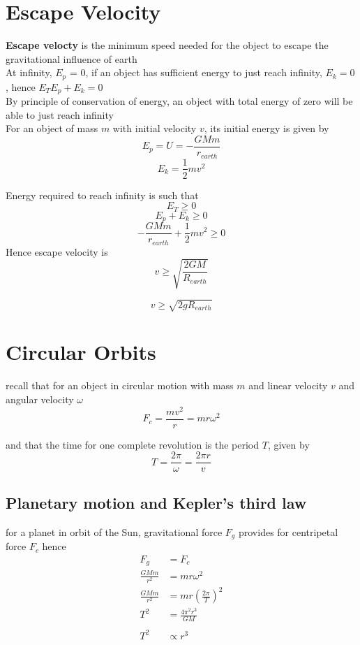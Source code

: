 \documentclass[a4paper, 10pt]{article}
\begin{document}
\section{Escape Velocity}
\textbf{Escape velocty} is the minimum speed needed for the object to escape the gravitational influence of earth \\

At infinity, $E_p$ = 0, if an object has sufficient energy to just reach infinity, $E_k = 0$, hence $E_T E_p + E_k = 0$ \\

By principle of conservation of energy, an object with total energy of zero will be able to just reach infinity \\

For an object of mass $m$ with initial velocity $v$, its initial energy is given by
\[
   E_p = U = - \frac{GMm}{r_{earth}}
\]
\[
E_k = \frac{1}{2} mv^2
\]

Energy required to reach infinity is such that
\[
 E_T \ge 0
\]
\[
E_p + E_k \ge 0
\]
\[
    - \frac{GMm}{r_{earth}}  + \frac{1}{2}mv^2 \ge 0
\]
Hence escape velocity is 
\[
   v \ge \sqrt{ \frac{2GM}{R_{earth}}}
\]

\[
   v \ge \sqrt{2gR_{earth}}
\]



\section{Circular Orbits}
recall that for an object in circular motion with mass $m$ and linear velocity $v$ and angular velocity $\omega$ 
\[
F_c = \frac{mv^2}{r} = mr\omega^2
\]

and that the time for one complete revolution is the period $T$, given by
\[
T = \frac{2\pi}{\omega} = \frac{2\pi r}{v}
\]


\subsection{Planetary motion and Kepler's third law}

for a planet in orbit of the Sun, gravitational force $F_g$ provides for centripetal force $F_c$ hence 
\begin{align*}
   F_g &= F_c \\ 
   \frac{GMm}{r^2} &= mr\omega^2 \\ 
   \frac{GMm}{r^2} &= mr \left( \frac{2\pi}{T}\right)^2 \\ 
   T^2 &= \frac{4\pi^2r^3}{GM} \\ \\
   T^2 &\propto r^3
\end{align*}	
\end{document}
